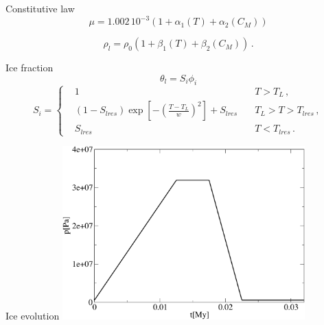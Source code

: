 \documentclass{beamer}
\begin{document}
\begin{frame}{Constitutive law}
		\begin{equation*}
			\mu=1.002\, 10^{-3} \left( 1+ \alpha_1(T) +\alpha_2(C_M) \right)
		\end{equation*}
		 
		\begin{equation*}
			\rho_l =  \rho_0(1+\beta_1(T)+ \beta_2(C_M) )\, .
			\label{consrho}
		\end{equation*}
\end{frame}
\begin{frame}{Ice fraction}
\begin{equation*}
\theta_l =S_i \phi_i
\end{equation*} 
\begin{equation*}
S_i=\left\{
\begin{aligned}
&1 \quad & T > T_L \,,\\
&(1-S_{lres})\exp\left[ - \left( \frac{T-T_L}{w}\right)^2 \right] +
S_{lres} \quad & T_L> T > T_{lres}\,,\\
&S_{lres}  \quad &  T < T_{lres}\,.
\end{aligned}
\right.
\end{equation*}
\end{frame}
\begin{frame}{Ice evolution}
\centering
\includegraphics[width=0.7\textwidth]{figure/top_pres}
\end{frame}
\end{document}
